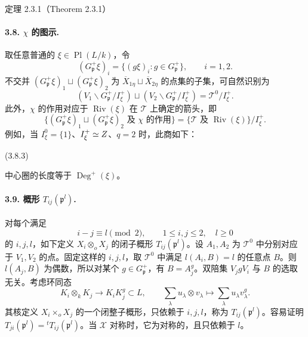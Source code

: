 \begin{originaltheorem}{定理 2.3.1（Theorem 2.3.1）}
\paragraph*{3.8. $\chi$ 的图示.}
取任意普通的 $\xi\in\operatorname{Pl}(L/k)$，令
\[
 (G_{\mathfrak p}^+\xi)_i=\{(g\xi)_i:g\in G_{\mathfrak p}^+\},
 \qquad i=1,2.\tag{3.8.1}
\]
不交并 $(G_{\mathfrak p}^+\xi)_1\sqcup(G_{\mathfrak p}^+\xi)_2$ 为 $\overline X_{1\eta}\sqcup\overline X_{2\eta}$ 的点集的子集，可自然识别为
\[
 (V_1\backslash G_{\mathfrak p}^+/I_\xi^+)
 \sqcup(V_2\backslash G_{\mathfrak p}^+/I_\xi^+)
 =\mathcal T^0/I_\xi^+.\tag{3.8.2}
\]
此外，$\chi$ 的作用对应于 $\operatorname{Riv}(\xi)$ 在 $\mathcal T$ 上确定的箭头，即
\[
 \{(G_{\mathfrak p}^+\xi)_1\sqcup(G_{\mathfrak p}^+\xi)_2
 \text{ 及 }\chi\text{ 的作用}\}
 =\{\mathcal T\text{ 及 }\operatorname{Riv}(\xi)\}/I_\xi^+.
\]
例如，当 $I_\xi^0=\{1\}$、$I_\xi^+\simeq Z$、$q=2$ 时，此商如下：
\begin{center}
\qquad(3.8.3)
\end{center}
中心圈的长度等于 $\operatorname{Deg}^+(\xi)$。

\paragraph*{3.9. 概形 $T_{ij}(\mathfrak p^l)$.}
对每个满足
\[
 i-j\equiv l\pmod2,\qquad1\leq i,j\leq2,\quad l\geq0\tag{3.9.1}
\]
的 $i,j,l$，如下定义 $X_i\otimes_oX_j$ 的闭子概形 $T_{ij}(\mathfrak p^l)$。设 $A_1,A_2$ 为 $\mathcal T^0$ 中分别对应于 $V_1,V_2$ 的点。固定这样的 $i,j,l$，取 $\mathcal T^0$ 中满足 $l(A_i,B)=l$ 的任意点 $B$。则 $l(A_j,B)$ 为偶数，所以对某个 $g\in G_{\mathfrak p}^+$，有 $B=A_j^g$。双陪集 $V_jgV_i$ 与 $B$ 的选取无关。考虑环同态
\[
 K_i\otimes_kK_j\longrightarrow K_iK_j^g\subset L,
 \qquad\sum_\lambda u_\lambda\otimes v_\lambda
 \longmapsto\sum_\lambda u_\lambda v_\lambda^g.
\]
其核定义 $X_i\times_oX_j$ 的一个闭整子概形，只依赖于 $i,j,l$，称为 $T_{ij}(\mathfrak p^l)$。容易证明 $T_{ji}(\mathfrak p^l)={}^tT_{ij}(\mathfrak p^l)$。当 $\mathcal X$ 对称时，它为对称的，且只依赖于 $l$。


\end{originaltheorem}
